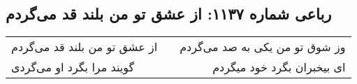 \begin{center}
\section*{رباعی شماره ۱۱۳۷: از عشق تو من بلند قد می‌گردم}
\label{sec:1137}
\begin{longtable}{l p{0.5cm} r}
از عشق تو من بلند قد می‌گردم
&&
وز شوق تو من یکی به صد می‌گردم
\\
گویند مرا بگرد او می‌گردی
&&
ای بیخبران بگرد خود میگردم
\\
\end{longtable}
\end{center}
